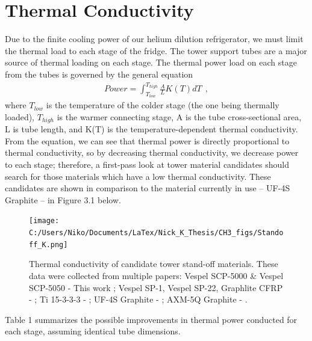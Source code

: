 \documentclass{report}
\begin{document}
\section{Thermal Conductivity}
Due to the finite cooling power of our helium dilution refrigerator, we must limit the
thermal load to each stage of the fridge. The tower support tubes are a major source of
thermal loading on each stage. The thermal power load on each stage from the tubes is
governed by the general equation
\begin{eqnarray}
Power = \int_{T_{low}}^{T_{high}} \frac{A}{L}K(T)dT \ \ , %
\end{eqnarray}
where $T_{low}$ is the temperature of the colder stage (the one being thermally loaded), $T_{high}$ is the warmer
connecting stage, A is the tube cross-sectional area, L is tube length, and K(T) is the temperature-dependent
thermal conductivity. From the equation, we can see that thermal power is directly proportional
to thermal conductivity, so by decreasing thermal conductivity, we decrease power to each
stage; therefore, a first-pass look at tower material candidates should search for those materials which have a low thermal conductivity. These candidates are shown in comparison to the material currently in use -- UF-4S Graphite -- in Figure 3.1 below.
\begin{figure}[htb]
\texttt{[image: C:/Users/Niko/Documents/LaTex/Nick\_K\_Thesis/CH3\_figs/Standoff\_K.png]}
\caption{Thermal conductivity of candidate tower stand-off materials. These data were collected from multiple papers: Vespel SCP-5000 \& Vespel SCP-5050 - This work ; Vespel SP-1, Vespel SP-22, Graphlite CFRP - \cite{run} ; Ti 15-3-3-3 - \cite{wik} ; UF-4S Graphite - \cite{lem} ; AXM-5Q Graphite - \cite{woo:gr}.}
\end{figure}



Table 1 summarizes the possible improvements in thermal power conducted for each stage,
assuming identical tube dimensions.
\end{document}
